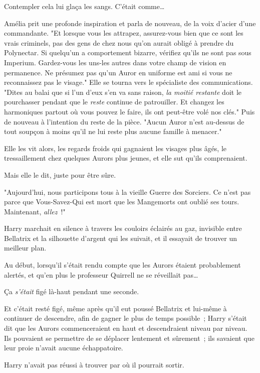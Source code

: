 Contempler cela lui glaça les sangs. C'était comme…

Amélia prit une profonde inspiration et parla de nouveau, de la voix d'acier d'une commandante. "Et lorsque vous les attrapez, assurez-vous bien que ce sont les vrais criminels, pas des gens de chez nous qu'on aurait obligé à prendre du Polynectar. Si quelqu'un a comportement bizarre, vérifiez qu'ils ne sont pas sous Imperium. Gardez-vous les uns-les autres dans votre champ de vision en permanence. Ne présumez pas qu'un Auror en uniforme est ami si vous ne reconnaissez pas le visage." Elle se tourna vers le spécialiste des communications. "Dites au balai que si l'un d'eux s'en va sans raison, \emph{la moitié restante} doit le pourchasser pendant que le \emph{reste} continue de patrouiller. Et changez les harmoniques partout où vous pouvez le faire, ils ont peut-être volé nos clés." Puis de nouveau à l'intention du reste de la pièce. "Aucun Auror n'est au-dessus de tout soupçon à moins qu'il ne lui reste plus aucune famille à menacer."

Elle les vit alors, les regards froids qui gagnaient les visages plus âgés, le tressaillement chez quelques Aurors plus jeunes, et elle sut qu'ils comprenaient.

Mais elle le dit, juste pour être sûre.

"Aujourd'hui, nous participons tous à la vieille Guerre des Sorciers. Ce n'est pas parce que Vous-Savez-Qui est mort que les Mangemorts ont oublié ses tours. Maintenant, \emph{allez}~!"

\later

Harry marchait en silence à travers les couloirs éclairés au gaz, invisible entre Bellatrix et la silhouette d'argent qui les suivait, et il essayait de trouver un meilleur plan.

Au début, lorsqu'il s'était rendu compte que les Aurors étaient probablement alertés, et qu'en plus le professeur Quirrell ne se réveillait pas…

Ça \emph{s'était} figé là-haut pendant une seconde.

Et c'était resté figé, même après qu'il eut poussé Bellatrix et lui-même à continuer de descendre, afin de gagner le plus de temps possible~; Harry s'était dit que les Aurors commenceraient en haut et descendraient niveau par niveau. Ils pouvaient se permettre de se déplacer lentement et sûrement~; ils savaient que leur proie n'avait aucune échappatoire.

Harry n'avait pas réussi à trouver par où il pourrait sortir.


